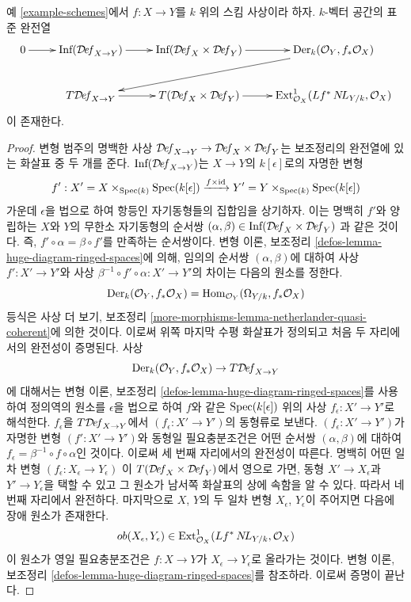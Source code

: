 \begin{lemma}
\label{lemma-schemes-morphisms-TI}
예 \ref{example-schemes}에서 $f : X \to Y$를 $k$ 위의 스킴 사상이라
하자.%
$k$-벡터 공간의 표준 완전열
$$
\xymatrix{
0 \ar[r] &
\text{Inf}(\Deformationcategory_{X \to Y}) \ar[r] &
\text{Inf}(\Deformationcategory_X \times \Deformationcategory_Y) \ar[r] &
\text{Der}_k(\mathcal{O}_Y, f_*\mathcal{O}_X) \ar[lld] \\
& T\Deformationcategory_{X \to Y} \ar[r] &
T(\Deformationcategory_X \times \Deformationcategory_Y) \ar[r] &
\text{Ext}^1_{\mathcal{O}_X}(Lf^*\NL_{Y/k}, \mathcal{O}_X)
}
$$
이 존재한다.
\end{lemma}

\begin{proof}
변형 범주의 명백한 사상
$\mathcal{D}\!\mathit{ef}_{X \to Y} \to
\mathcal{D}\!\mathit{ef}_X \times \mathcal{D}\!\mathit{ef}_Y$는 보조정리의
완전열에 있는 화살표 중 두 개를 준다.
$\text{Inf}(\mathcal{D}\!\mathit{ef}_{X \to Y})$는 $X \to Y$의
$k[\epsilon]$로의 자명한 변형
$$
f' :  X' = X \times_{\mathop{\mathrm{Spec}}(k)} \mathop{\mathrm{Spec}}(k[\epsilon])
\xrightarrow{f \times \text{id}}
Y' = Y \times_{\mathop{\mathrm{Spec}}(k)} \mathop{\mathrm{Spec}}(k[\epsilon])
$$
가운데 $\epsilon$을 법으로 하여 항등인 자기동형들의 집합임을 상기하자.
이는 명백히 $f'$와 양립하는 $X$와 $Y$의 무한소 자기동형의 순서쌍
$(\alpha, \beta) \in
\text{Inf}(\mathcal{D}\!\mathit{ef}_X \times \mathcal{D}\!\mathit{ef}_Y)$
과 같은 것이다. 즉, $f' \circ \alpha = \beta \circ f'$를 만족하는
순서쌍이다. 변형 이론, 보조정리
\ref{defos-lemma-huge-diagram-ringed-spaces}에 의해, 임의의 순서쌍
$(\alpha, \beta)$에 대하여 사상 $f' : X' \to Y'$와 사상
$\beta^{-1} \circ f' \circ \alpha : X' \to Y'$의 차이는 다음의 원소를
정한다.
$$
\text{Der}_k(\mathcal{O}_Y, f_*\mathcal{O}_X) =
\mathop{\mathrm{Hom}}\nolimits_{\mathcal{O}_Y}(\Omega_{Y/k}, f_*\mathcal{O}_X)
$$
등식은 사상 더 보기, 보조정리
\ref{more-morphisms-lemma-netherlander-quasi-coherent}에 의한 것이다.
이로써 위쪽 마지막 수평 화살표가 정의되고 처음 두 자리에서의 완전성이
증명된다. 사상
$$
\text{Der}_k(\mathcal{O}_Y, f_*\mathcal{O}_X)
\to
T\mathcal{D}\!\mathit{ef}_{X \to Y}
$$
에 대해서는 변형 이론, 보조정리
\ref{defos-lemma-huge-diagram-ringed-spaces}를 사용하여 정의역의 원소를
$\epsilon$을 법으로 하여 $f$와 같은 $\mathop{\mathrm{Spec}}(k[\epsilon])$ 위의 사상
$f_\epsilon : X' \to Y'$로 해석한다. $f_\epsilon$을
$T\mathcal{D}\!\mathit{ef}_{X \to Y}$에서 $(f_\epsilon : X' \to Y')$의
동형류로 보낸다. $(f_\epsilon : X' \to Y')$가 자명한 변형
$(f' : X' \to Y')$와 동형일 필요충분조건은 어떤 순서쌍
$(\alpha, \beta)$에 대하여
$f_\epsilon  = \beta^{-1} \circ f \circ \alpha$인 것이다.%
이로써 세 번째 자리에서의 완전성이 따른다. 명백히 어떤 일차 변형
$(f_\epsilon : X_\epsilon \to Y_\epsilon)$
이 $T(\mathcal{D}\!\mathit{ef}_X \times \mathcal{D}\!\mathit{ef}_Y)$에서 영으로
가면, 동형 $X' \to X_\epsilon$과 $Y' \to Y_\epsilon$을 택할 수 있고
그 원소가 남서쪽 화살표의 상에 속함을 알 수 있다. 따라서 네 번째
자리에서 완전하다. 마지막으로 $X$, $Y$의 두 일차 변형
$X_\epsilon$, $Y_\epsilon$이 주어지면 다음에 장애 원소가 존재한다.
$$
ob(X_\epsilon, Y_\epsilon) \in
\text{Ext}^1_{\mathcal{O}_X}(Lf^*\mathop{N\!L}\nolimits_{Y/k}, \mathcal{O}_X)
$$
이 원소가 영일 필요충분조건은 $f : X \to Y$가
$X_\epsilon \to Y_\epsilon$로 올라가는 것이다. 변형 이론, 보조정리
\ref{defos-lemma-huge-diagram-ringed-spaces}를 참조하라. 이로써 증명이
끝난다.
\end{proof}

